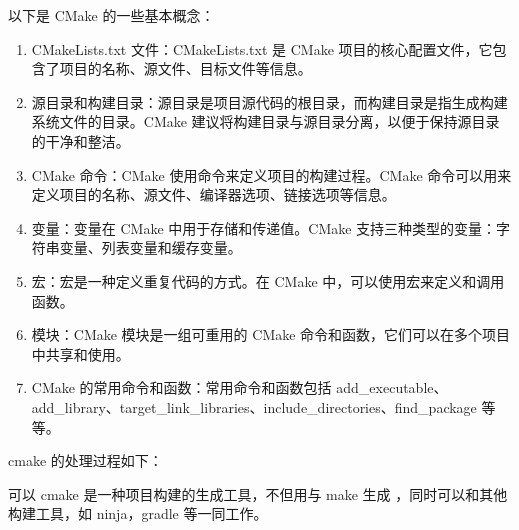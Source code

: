 \documentclass[a4paper,12pt,english]{sphinxmanual}
\begin{document}
\sphinxAtStartPar
以下是 CMake 的一些基本概念：
\begin{enumerate}
%
\item {} 
\sphinxAtStartPar
CMakeLists.txt 文件：CMakeLists.txt 是 CMake 项目的核心配置文件，它包含了项目的名称、源文件、目标文件等信息。

\item {} 
\sphinxAtStartPar
源目录和构建目录：源目录是项目源代码的根目录，而构建目录是指生成构建系统文件的目录。CMake 建议将构建目录与源目录分离，以便于保持源目录的干净和整洁。

\item {} 
\sphinxAtStartPar
CMake 命令：CMake 使用命令来定义项目的构建过程。CMake 命令可以用来定义项目的名称、源文件、编译器选项、链接选项等信息。

\item {} 
\sphinxAtStartPar
变量：变量在 CMake 中用于存储和传递值。CMake 支持三种类型的变量：字符串变量、列表变量和缓存变量。

\item {} 
\sphinxAtStartPar
宏：宏是一种定义重复代码的方式。在 CMake 中，可以使用宏来定义和调用函数。

\item {} 
\sphinxAtStartPar
模块：CMake 模块是一组可重用的 CMake 命令和函数，它们可以在多个项目中共享和使用。

\item {} 
\sphinxAtStartPar
CMake 的常用命令和函数：常用命令和函数包括 add\_executable、add\_library、target\_link\_libraries、include\_directories、find\_package 等等。

\end{enumerate}

\sphinxAtStartPar
cmake 的处理过程如下：

\sphinxAtStartPar
{}

\sphinxAtStartPar
可以 cmake 是一种项目构建的生成工具，不但用与 make 生成 ，同时可以和其他构建工具，如 ninja，gradle 等一同工作。
\end{document}
